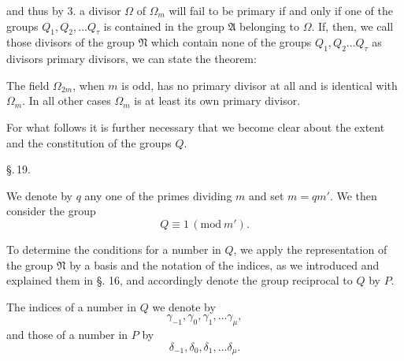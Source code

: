 and thus by 3. a divisor $\Omega$ of $\Omega_m$ will fail to be primary
if and only if one of the groups $Q_1, Q_2, \ldots Q_\tau$ is contained
in the group $\mathfrak{A}$ belonging to $\Omega$. If, then, we call
those divisors of the group $\mathfrak{N}$ which contain none of the groups $Q_1, Q_2 \ldots Q_\tau$
as divisors primary divisors, we can state the theorem:



The field $\Omega_{2m}$, when $m$ is odd, has no primary divisor at all and is identical with $\Omega_m$. In all other cases
$\Omega_m$ is at least its own primary divisor.

For what follows it is further necessary that we become clear
about the extent and the constitution of the groups $Q$.

\begin{center}
\S.\,19.

\end{center}

We denote by $q$ any one of the primes dividing $m$
and set $m = q m'$. We then consider the
group
\[
Q \equiv 1\,(\mathrm{mod}\ m').
\]

To determine the conditions for a number in $Q$, we apply
the representation of the group $\mathfrak{N}$ by a basis and the
notation of the indices, as we introduced and explained them
in §. 16, and accordingly denote the group reciprocal to $Q$
by $P$.

The indices of a number in $Q$ we denote by
\[
\gamma_{-1}, \gamma_0, \gamma_1, \ldots \gamma_\mu,
\]
and those of a number in $P$ by
\[
\delta_{-1}, \delta_0, \delta_1, \ldots \delta_\mu.
\]
